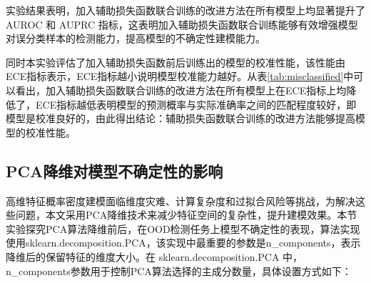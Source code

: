 实验结果表明，加入辅助损失函数联合训练的改进方法在所有模型上均显著提升了 AUROC 和 AUPRC 指标，这表明加入辅助损失函数联合训练能够有效增强模型对误分类样本的检测能力，提高模型的不确定性建模能力。

同时本实验评估了加入辅助损失函数前后训练出的模型的校准性能，该性能由ECE指标表示，ECE指标越小说明模型校准能力越好。从表\ref{tab:misclassified}中可以看出，加入辅助损失函数联合训练的改进方法在所有模型上在ECE指标上均降低了，ECE指标越低表明模型的预测概率与实际准确率之间的匹配程度较好，即模型是校准良好的，由此得出结论：辅助损失函数联合训练的改进方法能够提高模型的校准性能。
\begin{table}[h]
    \captionsetup{font=small, justification=centering}
    \centering
    \renewcommand{\arraystretch}{1.0} %
    \caption{误分类样本检测任务，实验结果在不同的模型(VGG16、ResNet50、VIT)上做实验,对比交叉熵损失函数训练和使用辅助损失函数联合训练对模型不确定性的建模效果，报告指标是AUROC($\uparrow$) / AUPRC($\uparrow$)/ECE($\downarrow$)}
    \label{tab:misclassified2}
\end{table}


\subsection{PCA降维对模型不确定性的影响}

高维特征概率密度建模面临维度灾难、计算复杂度和过拟合风险等挑战，为解决这些问题，本文采用PCA降维技术来减少特征空间的复杂性，提升建模效果。本节实验探究PCA算法降维前后，在OOD检测任务上模型不确定性的表现，算法实现使用sklearn.decomposition.PCA，该实现中最重要的参数是n\_components，表示降维后的保留特征的维度大小。在 sklearn.decomposition.PCA 中，n\_components参数用于控制PCA算法选择的主成分数量，具体设置方式如下：

